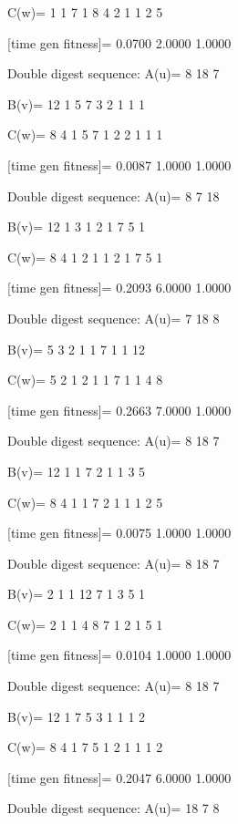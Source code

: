 C(w)=
     1     1     7     1     8     4     2     1     1     2     5

[time gen fitness]=
    0.0700    2.0000    1.0000

Double digest sequence:
A(u)=
     8    18     7

B(v)=
    12     1     5     7     3     2     1     1     1

C(w)=
     8     4     1     5     7     1     2     2     1     1     1

[time gen fitness]=
    0.0087    1.0000    1.0000

Double digest sequence:
A(u)=
     8     7    18

B(v)=
    12     1     3     1     2     1     7     5     1

C(w)=
     8     4     1     2     1     1     2     1     7     5     1

[time gen fitness]=
    0.2093    6.0000    1.0000

Double digest sequence:
A(u)=
     7    18     8

B(v)=
     5     3     2     1     1     7     1     1    12

C(w)=
     5     2     1     2     1     1     7     1     1     4     8

[time gen fitness]=
    0.2663    7.0000    1.0000

Double digest sequence:
A(u)=
     8    18     7

B(v)=
    12     1     1     7     2     1     1     3     5

C(w)=
     8     4     1     1     7     2     1     1     1     2     5

[time gen fitness]=
    0.0075    1.0000    1.0000

Double digest sequence:
A(u)=
     8    18     7

B(v)=
     2     1     1    12     7     1     3     5     1

C(w)=
     2     1     1     4     8     7     1     2     1     5     1

[time gen fitness]=
    0.0104    1.0000    1.0000

Double digest sequence:
A(u)=
     8    18     7

B(v)=
    12     1     7     5     3     1     1     1     2

C(w)=
     8     4     1     7     5     1     2     1     1     1     2

[time gen fitness]=
    0.2047    6.0000    1.0000

Double digest sequence:
A(u)=
    18     7     8

